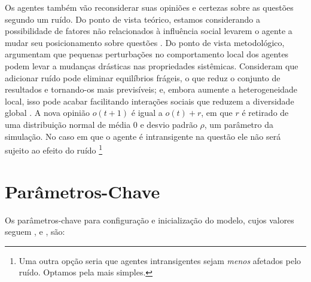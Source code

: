 Os agentes também vão reconsiderar suas opiniões e certezas sobre as questões
segundo um ruído. Do ponto de vista teórico, estamos considerando a
possibilidade de fatores não relacionados à influência social levarem o agente a
mudar seu posicionamento sobre questões \cite{flache2017, lorenz2017modeling}.
Do ponto de vista metodológico,  argumentam que
pequenas perturbações no comportamento local dos agentes podem levar a mudanças
drásticas nas propriedades sistêmicas. Consideram que adicionar ruído pode
eliminar equilíbrios frágeis, o que reduz o conjunto de resultados e tornando-os
mais previsíveis; e, embora aumente a heterogeneidade local, isso pode acabar
facilitando interações sociais que reduzem a diversidade global
\cite[p.323]{macy2015signal}. A nova opinião \(o(t+1)\) é igual a \(o(t) + r\),
em que \(r\) é retirado de uma distribuição normal de média 0 e desvio padrão
\(\rho\), um parâmetro da simulação. No caso em que o agente é intransigente na
questão ele não será sujeito ao efeito do ruído \footnote{Uma outra opção seria
  que agentes intransigentes sejam \textit{menos} afetados pelo ruído. Optamos
  pela mais simples.}


\section{Parâmetros-Chave}

Os parâmetros-chave para configuração e inicialização do modelo, cujos valores
seguem ,  e
, são:

